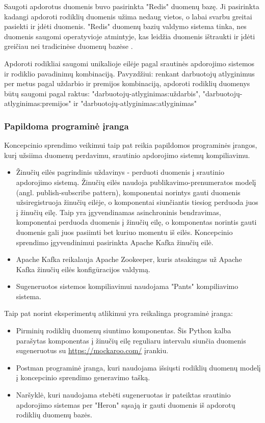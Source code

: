 \documentclass{VUMIFPSbakalaurinis}
\begin{document}
Saugoti apdorotus duomenis buvo pasirinkta "Redis" duomenų bazę. Ji pasirinkta kadangi apdoroti rodiklių duomenis užima nedaug vietos, o labai svarbu greitai pasiekti ir įdėti duomenis. "Redis" duomenų bazių valdymo sistema tinka, nes duomenis saugomi operatyvioje atmintyje, kas leidžia duomenis ištraukti ir įdėti greičiau nei tradicinėse duomenų bazėse \cite{carlson2013redis}.\par
Apdoroti rodikliai saugomi unikalioje eilėje pagal srautinės apdorojimo sistemos ir rodiklio pavadinimų kombinaciją. Pavyzdžiui: renkant darbuotojų atlyginimus per metus pagal uždarbio ir premijos kombinaciją, apdoroti rodiklių duomenys būtų saugomi pagal raktus: "darbuotojų-atlyginimas:uždarbis", "darbuotojų-atlyginimas:premijos" ir "darbuotojų-atlyginimas:atlyginimas"

\subsubsection{Papildoma programinė įranga}

Koncepcinio sprendimo veikimui taip pat reikia papildomos programinės įrangos, kurį užsiima duomenų perdavimu, srautinio apdorojimo sistemų kompiliavimu.
\begin{itemize}
    \item Žinučių eilės pagrindinis uždavinys - perduoti duomenis į srautinio apdorojimo sistemą. Žinučių eilės naudoja publikavimo-prenumeratos modelį (angl. publish-subscribe pattern), komponentai norintys gauti duomenis užsiregistruoja žinučių eilėje, o komponentai siunčiantis tiesiog perduoda juos į žinučių eilę. Taip yra įgyvendinamas asinchroninis bendravimas, komponentai perduoda duomenis į žinučių eilę, o komponentas norintis gauti duomenis gali juos pasiimti bet kuriuo momentu iš eilės. Koncepcinio sprendimo įgyvendinimui pasirinkta Apache Kafka žinučių eilė.
    \item Apache Kafka reikalauja Apache Zookeeper, kuris atsakingas už Apache Kafka žinučių eilės konfigūracijos valdymą.
    \item Sugeneruotos sistemos kompiliavimui naudojama "Pants" kompiliavimo sistema.
\end{itemize}
Taip pat norint eksperimentų atlikimui yra reikalinga programinė įranga:
\begin{itemize}
    \item Pirminių rodiklių duomenų siuntimo komponentas. Šis Python kalba parašytas komponentas į žinučių eilę reguliaru intervalu siunčia duomenis sugeneruotus su \url{https://mockaroo.com/} įrankiu.
    \item Postman programinė įranga, kuri naudojama išsiųsti rodiklių duomenų modelį į koncepcinio sprendimo generavimo tašką.
    \item Naršyklė, kuri naudojama stebėti sugeneruotas ir pateiktas srautinio apdorojimo sistemas per "Heron" sąsają ir gauti duomenis iš apdorotų rodiklių duomenų bazės.
\end{itemize}
\end{document}
